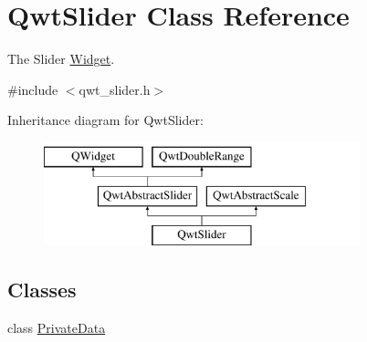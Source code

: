 \hypertarget{class_qwt_slider}{\section{Qwt\-Slider Class Reference}
\label{class_qwt_slider}
}


The Slider \hyperlink{class_widget}{Widget}.  




{\ttfamily \#include $<$qwt\-\_\-slider.\-h$>$}

Inheritance diagram for Qwt\-Slider\-:\begin{figure}[H]
\begin{center}
\leavevmode
\includegraphics[height=3.000000cm]{class_qwt_slider}
\end{center}
\end{figure}
\subsection*{Classes}
\begin{DoxyCompactItemize}
\item 
class \hyperlink{class_qwt_slider_1_1_private_data}{Private\-Data}
\end{DoxyCompactItemize}
